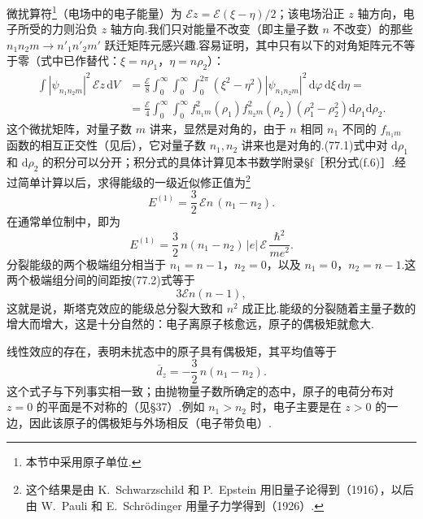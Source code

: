 微扰算符\footnote{本节中采用原子单位.}（电场中的电子能量）为 $\mathcal{E}z=\mathcal{E}(\xi-\eta)/2$；该电场沿正 $z$ 轴方向，电子所受的力则沿负 $z$ 轴方向.我们只对能量不改变（即主量子数 $n$ 不改变）的那些 $n_1n_2m\rightarrow n'_1n'_2m'$ 跃迁矩阵元感兴趣.容易证明，其中只有以下的对角矩阵元不等于零（式中已作替代：$\xi=n\rho_1$，$\eta=n\rho_2$）：
\begin{equation}
\begin{aligned}
  \int|\psi_{n_1n_2m}|^{2}\,\mathcal{E}z\,\mathrm{d}V
  &=\frac{\mathcal{E}}{8}\int_0^{\infty}\int_0^{\infty}\int_0^{2\pi}
  \left(\xi^{2}-\eta^{2}\right)|\psi_{n_1n_2m}|^{2}\,
  \mathrm{d}\varphi\,\mathrm{d}\xi\,\mathrm{d}\eta=\\
  &=\frac{\mathcal{E}}{4}\int_0^{\infty}\int_0^{\infty}
  f_{n_1m}^{2}(\rho_1)f_{n_2m}^{2}(\rho_2)
  \left(\rho_1^{2}-\rho_2^{2}\right)\mathrm{d}\rho_1\mathrm{d}\rho_2.
\end{aligned}
\end{equation}
这个微扰矩阵，对量子数 $m$ 讲来，显然是对角的，由于 $n$ 相同 $n_1$ 不同的 $f_{n_1m}$ 函数的相互正交性（见后），它对量子数 $n_1,n_2$ 讲来也是对角的.(77.1)式中对 $\mathrm{d}\rho_1$ 和 $\mathrm{d}\rho_2$ 的积分可以分开；积分式的具体计算见本书数学附录§f［积分式(f.6)］.经过简单计算以后，求得能级的一级近似修正值为\footnote{这个结果是由 K.~Schwarzschild 和 P.~Epstein 用旧量子论得到（1916），以后由 W.~Pauli 和 E.~Schr\"odinger 用量子力学得到（1926）.}
\begin{equation}
  E^{(1)}=\frac{3}{2}\,\mathcal{E}n\,(n_1-n_2).
\end{equation}
在通常单位制中，即为
\begin{equation*}
  E^{(1)}=\frac{3}{2}\,n(n_1-n_2)\,|e|\,\mathcal{E}\,\frac{\hbar^{2}}{me^{2}}.
\end{equation*}
分裂能级的两个极端组分相当于 $n_1=n-1$，$n_2=0$，以及 $n_1=0$，$n_2=n-1$.这两个极端组分间的间距按(77.2)式等于
\begin{equation*}
  3\mathcal{E}n(n-1),
\end{equation*}
这就是说，斯塔克效应的能级总分裂大致和 $n^{2}$ 成正比.能级的分裂随着主量子数的增大而增大，这是十分自然的：电子离原子核愈远，原子的偶极矩就愈大.

线性效应的存在，表明未扰态中的原子具有偶极矩，其平均值等于
\begin{equation}
  \overline{d}_z=-\frac{3}{2}\,n(n_1-n_2).
\end{equation}
这个式子与下列事实相一致；由抛物量子数所确定的态中，原子的电荷分布对 $z=0$ 的平面是不对称的（见§37）.例如 $n_1>n_2$ 时，电子主要是在 $z>0$ 的一边，因此该原子的偶极矩与外场相反（电子带负电）.


